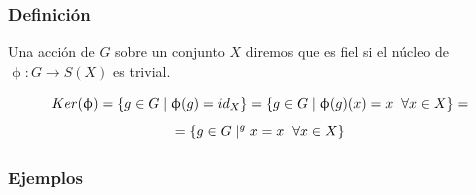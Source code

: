\documentclass[11pt,a4paper]{article}
\begin{document}
\subsubsection*{Definición}

Una acción de $G$ sobre un conjunto $X$ diremos que es fiel si el núcleo de $\upphi: G \to S(X)$ es trivial.

$$Ker(\upphi) = \{g \in G \mid \upphi(g) = id_{X}\} = \{g \in G \mid \upphi(g)(x) = x \hspace{0.2cm} \forall x \in X\} =$$ $$= \{g \in G \mid ^{g}x = x \hspace{0.2cm} \forall x \in X\}$$

\subsubsection*{Ejemplos}
\end{document}
